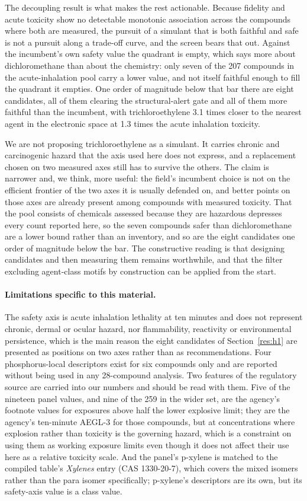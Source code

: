 \documentclass[11pt,a4paper]{article}
\begin{document}
The decoupling result is what makes the rest actionable. Because fidelity and
acute toxicity show no detectable monotonic association across the compounds
where both are measured, the
pursuit of a simulant that is both faithful and safe is not a pursuit along a
trade-off curve, and the screen bears that out. Against the incumbent's own
safety value the quadrant is empty, which says more about dichloromethane than
about the chemistry: only seven of the 207 compounds in the
acute-inhalation pool carry a lower value, and not itself faithful enough to fill the quadrant it empties. One order
of magnitude below that bar there are eight candidates, all of
them clearing the structural-alert gate and all of them more faithful than the
incumbent, with trichloroethylene 3.1 times closer to the nearest agent in the
electronic space at 1.3 times the acute inhalation toxicity.

We are not proposing trichloroethylene as a simulant. It carries chronic and
carcinogenic hazard that the axis used here does not express, and a replacement
chosen on two measured axes still has to survive the others. The claim is
narrower and, we think, more useful: the field's incumbent choice is not on the
efficient frontier of the two axes it is usually defended on, and better points
on those axes are already present among compounds with measured toxicity. That
the pool consists of chemicals assessed because they are hazardous depresses
every count reported here, so the seven compounds safer than
dichloromethane are a lower bound rather than an inventory, and so are the eight
candidates one order of magnitude below the bar. The constructive reading is that designing candidates and then
measuring them remains worthwhile, and that the filter excluding agent-class
motifs by construction can be applied from the start.

\paragraph{Limitations specific to this material.} The safety axis is acute inhalation lethality at
ten minutes and does not represent chronic, dermal or ocular hazard, nor
flammability, reactivity or environmental persistence, which is the main reason
the eight candidates of Section~\ref{res:h1} are presented as positions on two
axes rather than as recommendations. Four phosphorus-local descriptors exist for
six compounds only and are reported without being used in any 28-compound
analysis. Two features of the regulatory source are carried into our numbers and
should be read with them. Five of the nineteen panel values, and nine of the 259
in the wider set, are the agency's footnote values for exposures above half the
lower explosive limit; they are the agency's ten-minute AEGL-3 for those
compounds, but at concentrations where explosion rather than toxicity is the
governing hazard, which is a constraint on using them as working exposure
limits even though it does not affect their use here as a relative toxicity
scale. And the panel's p-xylene is matched to the compiled table's
\textit{Xylenes} entry (CAS 1330-20-7), which covers the mixed isomers rather
than the para isomer specifically; p-xylene's descriptors are its own, but its
safety-axis value is a class value.


\end{document}
